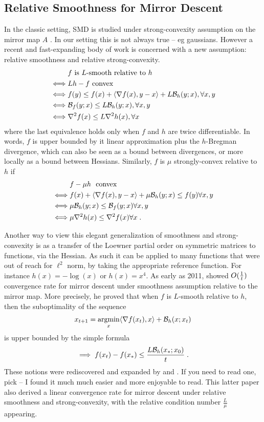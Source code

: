 \documentclass{article}
\newcommand{\logpart}{A}
\begin{document}
\subsection{Relative Smoothness for Mirror Descent}
In the classic setting, SMD is studied under strong-convexity assumption on the mirror map $\logpart$ \citep{bubeck2015convex}.
In our setting this is not always true -- eg gaussians.
However a recent and fast-expanding body of work is concerned with a new assumption: relative smoothness and relative strong-convexity.
\begin{align}
	& \text{$f$ is $L$-smooth relative to $h$} \\
	\iff & Lh - f \ \text{convex} \\
	\iff & f(y) \leq 	f(x) + \langle \nabla f(x) , y-x \rangle + L{\mathcal B}_h(y;x), \forall x,y \\
	\iff & {\mathcal B}_f(y;x) \leq L {\mathcal B}_h(y;x), \forall x,y \\
	\iff & \nabla^2 f(x) \leq L \nabla^2 h(x),  \forall x
\end{align} 
where the last equivalence holds only when $f$ and $h$ are twice differentiable. In words, $f$ is upper bounded by it linear approximation plus the $h$-Bregman divergence, which can also be seen as a bound between divergences, or more locally as a bound between Hessians. Similarly, $f$ is $\mu$ strongly-convex relative to $h$ if
\begin{align}
	& f-\mu h \ \text{ convex} \\
	\iff & f(x) + \langle \nabla f(x) , y-x \rangle + \mu {\mathcal B}_h(y;x) \leq f(y)\forall x,y \\
	\iff & \mu{\mathcal B}_h(y;x) \leq {\mathcal B}_f(y;x) \forall x,y \\
	\iff & \mu \nabla^2 h(x) \leq \nabla^2 f(x)  \forall x \; .
\end{align} 

Another way to view this elegant generalization of smoothness and strong-convexity is as a transfer of the Loewner partial order on symmetric matrices to functions, via the Hessian. 
As such it can be applied to many functions that were out of reach for $\ell^2$ norm, by taking the appropriate reference function.  For instance $h(x) = -\log(x)$ or $h(x) = x^4$. 
As early as 2011, \citet{birnbaum2011distributed} showed $O(\frac{1}{t})$ convergence rate for mirror descent under smoothness assumption relative to the mirror map. 
More precisely, he proved that when $f$ is $L$-smooth relative to $h$, then the suboptimality of the sequence 
\begin{align}
	x_{t+1}  = \operatorname*{argmin}_x \langle \nabla f(x_t), x \rangle + {\mathcal B}_h(x ; x_t)
\end{align}
is upper bounded by the simple formula
\begin{align}
	\implies f(x_t) - f(x_*) \leq \frac{L {\mathcal B}_h(x_* ; x_0) }{t} \; .
\end{align}
These notions were rediscovered and expanded by \citet{bauschke2017descent} and \citet{lu2018relatively}. If you need to read one, pick \citet{lu2018relatively} -- I found it much much easier and more enjoyable to read.  This latter paper also derived a linear convergence rate for mirror descent under relative smoothness and strong-convexity, with the relative condition number $\frac{L}{\mu}$ appearing.
\end{document}
